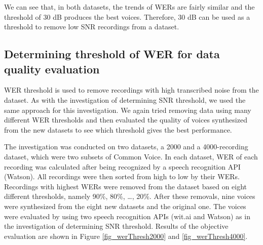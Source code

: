 \documentclass[12pt]{article}
\begin{document}
We can see that, in both datasets, the trends of WERs are fairly similar and the threshold of 30 dB produces the best voices. Therefore, 30 dB can be used as a threshold to remove low SNR recordings from a dataset.

\subsection{Determining threshold of WER for data quality evaluation}
WER threshold is used to remove recordings with high transcribed noise from the dataset. As with the investigation of determining SNR threshold, we used the same approach for this investigation. We again tried removing data using many different WER thresholds and then evaluated the quality of voices synthesized from the new datasets to see which threshold gives the best performance.

The investigation was conducted on two datasets, a 2000 and a 4000-recording dataset, which were two subsets of Common Voice. In each dataset, WER of each recording was calculated after being recognized by a speech recognition API (Watson). All recordings were then sorted from high to low by their WERs. Recordings with highest WERs were removed from the dataset based on eight different thresholds, namely 90\%, 80\%, …, 20\%. After these removals, nine voices were synthesized from the eight new datasets and the original one. The voices were evaluated by using two speech recognition APIs (wit.ai and Watson) as in the investigation of determining SNR threshold. Results of the objective evaluation are shown in Figure \ref{fig_werThresh2000} and \ref{fig_werThresh4000}.

\end{document}
